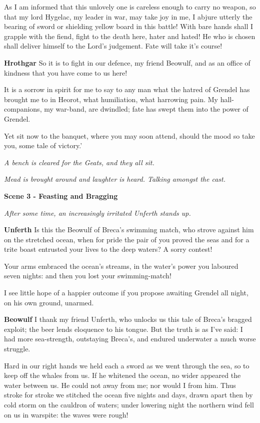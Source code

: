 \documentclass[a4paper]{article}
\begin{document}
{As I am informed that this unlovely one
is careless enough to carry no weapon,
so that my lord Hygelac, my leader in war,
may take joy in me, I abjure utterly
the bearing of sword or shielding yellow
board in this battle! With bare hands shall I
grapple with the fiend, fight to the death here,
hater and hated! He who is chosen
shall deliver himself to the Lord’s judgement.
Fate will take it's course!

\textbf{Hrothgar} So it is to fight in our defence, my friend Beowulf,
and as an office of kindness that you have come to us here!

It is a sorrow in spirit for me to say to any man
what the hatred of Grendel has brought me to in Heorot, 
what humiliation, what harrowing pain. 
My hall-companions, my war-band, are dwindled; 
fate has swept them into the power of Grendel.

Yet sit now to the banquet, where you may soon attend,
should the mood so take you, some tale of victory.’

\centerline{\textit{A bench is cleared for the Geats, and they all sit.}}
\centerline{\textit{Mead is brought around and laughter is heard. Talking amongst the cast.}}

\centerline{\textbf{Scene 3 - Feasting and Bragging}}
\centerline{\textit{After some time, an increasingly irritated Unferth stands up.}}

\textbf{Unferth} Is this the Beowulf of Breca's swimming match, 
who strove against him on the stretched ocean,
when for pride the pair of you proved the seas
and for a trite boast entrusted your lives
to the deep waters? A sorry contest!

Your arms embraced the ocean’s streams, in the water’s power
you laboured seven nights: and then you lost your swimming-match!

I see little hope of a happier outcome if you propose awaiting
Grendel all night, on his own ground, unarmed.

\textbf{Beowulf} I thank my friend Unferth, who unlocks us this tale
of Breca's bragged exploit; 
the beer lends eloquence to his tongue.
But the truth is as I’ve said:
I had more sea-strength, outstaying Breca’s,
and endured underwater a much worse struggle.

Hard in our right hands we held each a sword
as we went through the sea, so to keep off
the whales from us. If he whitened the ocean,
no wider appeared the water between us.
He could not away from me; nor would I from him.
Thus stroke for stroke we stitched the ocean
five nights and days, drawn apart then
by cold storm on the cauldron of waters;
under lowering night the northern wind
fell on us in warspite: the waves were rough!

}
\end{document}
